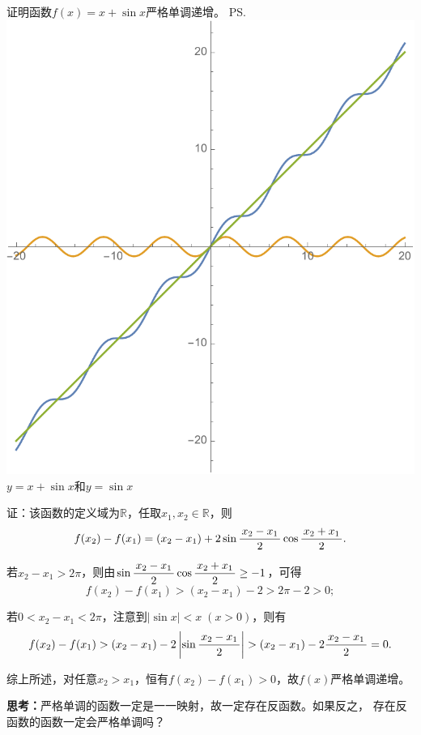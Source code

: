 \bs
\egz 证明函数$f(x)=x+\sin x$严格单调递增。
\ps{\centering
\includegraphics[width=\marginparwidth]{./images/ch01/xpsinx.pdf}\\
$y=x+\sin x$和$y=\sin x$}

证：该函数的定义域为$\mathbb{R}$，任取$x_1,x_2\in\mathbb{R}$，则
$$f(x_2)-f(x_1)=(x_2-x_1)+2\sin\displaystyle\frac{\,{x_2-x_1}\,}{\,{2}\,}\cos\displaystyle\frac{\,{x_2+x_1}\,}{\,{2}\,}.$$

若$x_2-x_1>2\pi$，则由$\sin\displaystyle\frac{\,{x_2-x_1}\,}{\,{2}\,}\cos\displaystyle\frac{\,{x_2+x_1}\,}{\,{2}\,}\geq -1$，可得
$$f(x_2)-f(x_1)>(x_2-x_1)-2>2\pi-2>0;$$

若$0<x_2-x_1<2\pi$，注意到$|\sin x|<x\;(x>0)$，则有
$$f(x_2)-f(x_1)>(x_2-x_1)-2\left|\sin\displaystyle\frac{\,{x_2-x_1}\,}{\,{2}\,}\right|
>(x_2-x_1)-2\displaystyle\frac{\,{x_2-x_1}\,}{\,{2}\,}=0.$$

综上所述，对任意$x_2>x_1$，恒有$f(x_2)-f(x_1)>0$，故$f(x)$严格单调递增。
\fin

\bs
{\bf 思考：}严格单调的函数一定是一一映射，故一定存在反函数。如果反之，
存在反函数的函数一定会严格单调吗？

